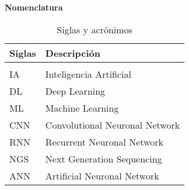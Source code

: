 \documentclass[12pt,onecolumn,letterpaper]{article}
\numberwithin{equation}{section} %
\numberwithin{figure}{section}
\numberwithin{table}{section}
\begin{document}



\newpage
\listoffigures
{}

\newpage
\listoftables
{}

\newpage
{}
\textbf{\Large{Nomenclatura}}

\begin{table}[h]
    \centering
    \caption{Siglas y acrónimos}
    \vspace{0.3cm}
    \begin{tabular}{
    >{\centering\arraybackslash}m{3cm}
    >{\centering\arraybackslash}m{12cm}}

\hline

        \textbf{Siglas} & 
        \textbf{Descripción}\\

\hline\hline
\\[0.2cm]
    IA & Inteligencia Artificial
\\[0.2cm]

   DL & Deep Learning
\\[0.2cm]

   ML & Machine Learning 
\\[0.2cm]

   CNN & Convolutional Neuronal Network
\\[0.2cm]
   RNN & Recurrent Neuronal Network 
\\[0.2cm]
   NGS & Next Generation Sequencing 
\\[0.2cm]
   ANN & Artificial Neuronal Network 
\\[0.2cm]

\hline
    \end{tabular}
\end{table}
\newpage

\setcounter{page}{1} %






\newpage
\end{document}
